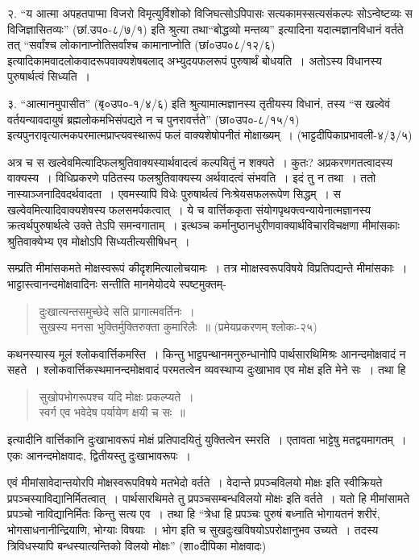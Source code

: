{२. “य आत्मा अपहतपाप्मा विजरो विमृत्युर्विशोको विजिघत्सोऽपिपासः सत्यकामस्सत्यसंकल्पः सोऽन्वेष्टव्यः स विजिज्ञासितव्यः” (छां.उप०-८/७/१) इति श्रुत्या तथा\break “बोद्धव्यो मन्तव्य” इत्यादिना यदात्मज्ञानविधानं वर्तते तत् “सर्वांश्च लोकानाप्नोति\break सर्वांश्च कामानाप्नोति (छां०उप०८/१२/६) इत्यादिकामवादलोकवादरूपवाक्यशेषबलाद् अभ्युदयफलरूपं पुरुषार्थं बोधयति~। अतोऽस्य विधानस्य पुरुषार्थत्वं सिध्यति~। 

३. “आत्मानमुपासीत” (बृ०उप०-१/४/६) इति श्रुत्यामात्मज्ञानस्य तृतीयस्य विधानं, तस्य “स खल्वेवं वर्तयन्यावदायुषं ब्रह्मलोकमभिसंपद्यते न च पुनरावर्त्तते” (छा०उप०-८/१५/१) इत्यपुनरावृत्यात्मकपरमात्मप्राप्त्यवस्थारूपं फलं वाक्यशेषोपनीतं मोक्षाख्यम्~। 
\hfill (भाट्टदीपिकाप्रभावली-४/३/५) 

अत्र च स खल्वेवमित्यादिफलश्रुतिवाक्यस्यार्थवादत्वं कल्पयितुं न शक्यते~। कुतः? अप्रकरणगतत्वादस्य वाक्यस्य~। विधिप्रकरणे पठितस्य फलश्रुतिवाक्यस्य अर्थवादत्वं संभवति~। इदं तु न तथा~। ततो नास्याञ्जनादिवदर्थवादता~। एवमस्यापि विधेः पुरुषार्थत्वं निःश्रेयसफलरूपेण सिद्धम्~। स खल्वेवमित्यादिवाक्यशेषस्य फलसमर्पकत्वात्~। ये च वार्त्तिककृता संयोगपृथक्त्वन्यायेनात्मज्ञानस्य क्रत्वर्थपुरुषार्थत्वे उक्ते तेऽपि समन्वगाताम्~। इत्थञ्च कर्मानुष्ठानधुरीणवाक्यार्थविचारविचक्षणा मीमांसकाः श्रुतिवाक्येभ्य एव मोक्षोऽपि सिध्यतीत्यसीषिधन्~। 

सम्प्रति मीमांसकमते मोक्षस्वरूपं कीदृशमित्यालोचयामः~। तत्र मोाक्षस्वरूपविषये विप्रतिपद्यन्ते मीमांसकाः~। भाट्टास्त्वानन्दमोक्षवादिनः सन्तीति मानमेयोदये स्पष्टमुक्तम्-
\newpage

\begin{verse}
दुःखात्यन्तसमुच्छेदे सति प्रागात्मवर्तिनः~। \\
सुखस्य मनसा भुक्तिर्मुक्तिरुक्ता कुमारिलैः~॥ (प्रमेयप्रकरणम् श्लोकः-२५)
\end{verse}
कथनस्यास्य मूलं श्लोकवार्त्तिकमस्ति~। किन्तु भाट्टपन्थानमनुरुन्धानोपि पार्थसारथिमिश्रः आनन्दमोक्षवादं न सहते~। श्लोकवार्त्तिकस्थमानन्दमोक्षवादं परमतत्वेन व्यवस्थाप्य दुःखाभाव एव मोक्ष इति मेने सः~। तथा हि
\begin{verse}
सुखोपभोगरूपश्च यदि मोक्षः प्रकल्प्यते~। \\
स्वर्ग एव भवेदेष पर्यायेण क्षयी च सः~॥ 
\end{verse}
इत्यादीनि वार्त्तिकानि दुःखाभावरूपं मोक्षं प्रतिपादयितुं युक्तित्वेन स्मरति~। एतावता भाट्टेषु मतद्वयमागतम्~। एकः आनन्दमोक्षवादः, द्वितीयस्तु दुःखाभावरूपः~। 

एवं मीमांसावेदान्तयोरपि मोक्षस्वरूपविषये मतभेदो वर्तते~। वेदान्ते प्रपञ्चविलयो मोक्षः इति स्वीक्रियते प्रपञ्चस्याविद्यानिर्मितत्वात्~। पार्थसारथिमते तु प्रपञ्चसम्बन्धविलयो मोक्षः इति वर्तते~। यतो हि मीमांसामते प्रपञ्चो नाविद्यानिर्मितः किन्तु सत्य एव~। तथा हि  “त्रेधा हि प्रपञ्चः पुरुषं बध्नाति भोगायतनं  शरीरं, भोगसाधनानीन्द्रियाणि, भोग्याः विषयाः~। भोग इति च सुखदुःखविषयोऽपरोक्षानुभव उच्यते~। तदस्य त्रिविधस्यापि बन्धस्यात्यन्तिको विलयो मोक्षः” (शा०दीपिका मोक्षवादः)

}
